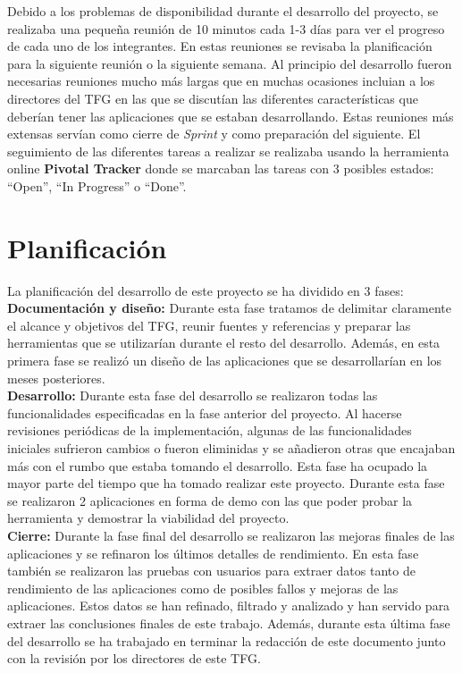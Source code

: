 Debido a los problemas de disponibilidad durante el desarrollo del proyecto, se realizaba una peque\~na reuni\'on de 10 minutos cada 1-3 d\'ias para ver el progreso de cada uno de los integrantes. En estas reuniones se revisaba la planificaci\'on para la siguiente reuni\'on o la siguiente semana. Al principio del desarrollo fueron necesarias reuniones mucho m\'as largas que en muchas ocasiones incluian a los directores del TFG en las que se discut\'ian las diferentes caracter\'isticas que deber\'ian tener las aplicaciones que se estaban desarrollando. Estas reuniones m\'as extensas serv\'ian como cierre de \textit{Sprint} y como preparaci\'on del siguiente. El seguimiento de las diferentes tareas a realizar se realizaba usando la herramienta online \textbf{Pivotal Tracker} donde se marcaban las tareas con 3 posibles estados: ``Open'', ``In Progress'' o ``Done''.


\section{Planificaci\'on}

La planificaci\'on del desarrollo de este proyecto se ha dividido en 3 fases:\\


\textbf{Documentaci\'on y dise\~no:} Durante esta fase tratamos de delimitar claramente el alcance y objetivos del TFG, reunir fuentes y referencias y preparar las herramientas que se utilizar\'ian durante el resto del desarrollo. Adem\'as, en esta primera fase se realiz\'o un dise\~no de las aplicaciones que se desarrollar\'ian en los meses posteriores.\\

\textbf{Desarrollo:} Durante esta fase del desarrollo se realizaron todas las funcionalidades especificadas en la fase anterior del proyecto. Al hacerse revisiones peri\'odicas de la implementaci\'on, algunas de las funcionalidades iniciales sufrieron cambios o fueron eliminidas y se a\~nadieron otras que encajaban m\'as con el rumbo que estaba tomando el desarrollo. 
Esta fase ha ocupado la mayor parte del tiempo que ha tomado realizar este proyecto. Durante esta fase se realizaron 2 aplicaciones en forma de demo con las que poder probar la herramienta y demostrar la viabilidad del proyecto.\\

\textbf{Cierre:} Durante la fase final del desarrollo se realizaron las mejoras finales de las aplicaciones y se refinaron los \'ultimos detalles de rendimiento. En esta fase tambi\'en se realizaron las pruebas con usuarios para extraer datos tanto de rendimiento de las aplicaciones como de posibles fallos y mejoras de las aplicaciones. Estos datos se han refinado, filtrado y analizado y han servido para extraer las conclusiones finales de este trabajo. Adem\'as, durante esta \'ultima fase del desarrollo se ha trabajado en terminar la redacci\'on de este documento junto con la revisi\'on por los directores de este TFG. 

